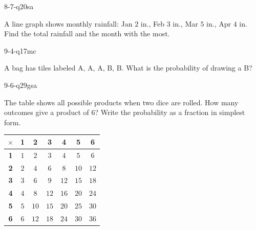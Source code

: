 \begin{practiceQuestion}{8-7-q20}{sa}
\begin{questionText}
A line graph shows monthly rainfall: Jan $2$ in., Feb $3$ in., Mar $5$ in., Apr $4$ in. Find the total rainfall and the month with the most.
\end{questionText}
\end{practiceQuestion}

\begin{practiceQuestion}{9-4-q17}{mc}
\begin{questionText}
A bag has tiles labeled A, A, A, B, B. What is the probability of drawing a B?
\end{questionText}
\end{practiceQuestion}

\begin{practiceQuestion}{9-6-q29}{gsa}
\begin{questionText}
The table shows all possible products when two dice are rolled. How many outcomes give a product of $6$? Write the probability as a fraction in simplest form.

\begin{center}
\begin{tabular}{|c|c|c|c|c|c|c|}
\hline
$\times$ & \textbf{1} & \textbf{2} & \textbf{3} & \textbf{4} & \textbf{5} & \textbf{6} \\
\hline
\textbf{1} & $1$ & $2$ & $3$ & $4$ & $5$ & $6$ \\
\hline
\textbf{2} & $2$ & $4$ & $6$ & $8$ & $10$ & $12$ \\
\hline
\textbf{3} & $3$ & $6$ & $9$ & $12$ & $15$ & $18$ \\
\hline
\textbf{4} & $4$ & $8$ & $12$ & $16$ & $20$ & $24$ \\
\hline
\textbf{5} & $5$ & $10$ & $15$ & $20$ & $25$ & $30$ \\
\hline
\textbf{6} & $6$ & $12$ & $18$ & $24$ & $30$ & $36$ \\
\hline
\end{tabular}
\end{center}
\end{questionText}
\end{practiceQuestion}


